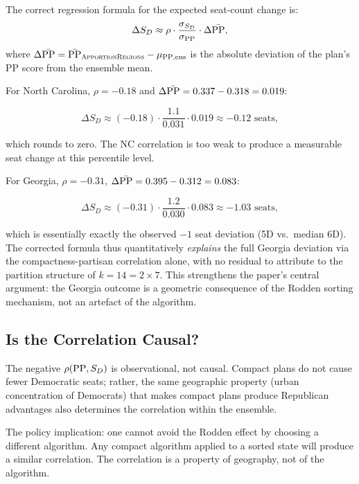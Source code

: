 The correct regression formula for the expected seat-count change is:
\begin{equation}
  \Delta S_D \approx \rho \cdot \frac{\sigma_{S_D}}{\sigma_{\mathrm{PP}}} \cdot \Delta\bar{\mathrm{PP}},
  \label{eq:delta-seats}
\end{equation}
where $\Delta\bar{\mathrm{PP}} = \bar{\mathrm{PP}}_{\textsc{ApportionRegions}} - \mu_{\mathrm{PP},\rm ens}$ is the absolute
deviation of the \ar{} plan's PP score from the ensemble mean.

For North Carolina, $\rho = -0.18$ and
$\Delta\bar{\mathrm{PP}} = 0.337 - 0.318 = 0.019$:

\begin{equation}
  \Delta S_D \approx (-0.18) \cdot \frac{1.1}{0.031} \cdot 0.019 \approx -0.12 \text{ seats},
\end{equation}

which rounds to zero.  The NC correlation is too weak to produce a
measurable seat change at this percentile level.

For Georgia, $\rho = -0.31$,
$\Delta\bar{\mathrm{PP}} = 0.395 - 0.312 = 0.083$:

\begin{equation}
  \Delta S_D \approx (-0.31) \cdot \frac{1.2}{0.030} \cdot 0.083 \approx -1.03 \text{ seats},
\end{equation}

which is essentially exactly the observed $-1$ seat deviation (5D vs.\ median
6D).  The corrected formula thus quantitatively \emph{explains} the full Georgia
deviation via the compactness-partisan correlation alone, with no residual to
attribute to the partition structure of $k = 14 = 2 \times 7$.  This
strengthens the paper's central argument: the Georgia outcome is a geometric
consequence of the Rodden sorting mechanism, not an artefact of the algorithm.

\subsection{Is the Correlation Causal?}

The negative $\rho(\mathrm{PP}, S_D)$ is observational, not causal.  Compact plans
do not cause fewer Democratic seats; rather, the same geographic property
(urban concentration of Democrats) that makes compact plans produce Republican
advantages also determines the correlation within the ensemble.

The policy implication: one cannot avoid the Rodden effect by choosing a
different algorithm.  Any compact algorithm applied to a sorted state will
produce a similar correlation.  The correlation is a property of geography,
not of the \ar{} algorithm.
